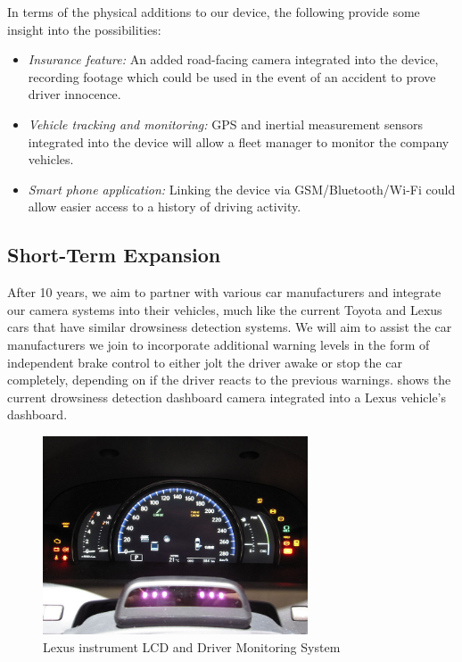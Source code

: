 In terms of the physical additions to our device, the following provide some insight into the possibilities:
\begin{itemize}
\item \textit{Insurance feature:} An added road-facing camera integrated into the device, recording footage which could be used in the event of an accident to prove driver innocence.

\item \textit{Vehicle tracking and monitoring:} GPS and inertial measurement sensors integrated into the device will allow a fleet manager to monitor the company vehicles.

\item \textit{Smart phone application:} Linking the device via GSM/Bluetooth/Wi-Fi could allow easier access to a history of driving activity.
\end{itemize}

\subsection{Short-Term Expansion}
After 10 years, we aim to partner with various car manufacturers and integrate our camera systems into their vehicles, much like the current Toyota \cite{toyota} and Lexus \cite{lexus} cars that have similar drowsiness detection systems. We will aim to assist the car manufacturers we join to incorporate additional warning levels in the form of independent brake control to either jolt the driver awake or stop the car completely, depending on if the driver reacts to the previous warnings.  shows the current drowsiness detection dashboard camera integrated into a Lexus vehicle's dashboard.

\begin{figure}[H]
\centering
\includegraphics[width=0.7\textwidth]{images/lexus_monitoring}
\vskip10pt
\caption[Lexus Dashboard]{Lexus instrument LCD and Driver Monitoring System \cite{lexusdash}}
\label{fig:lexusdash}
\end{figure}

